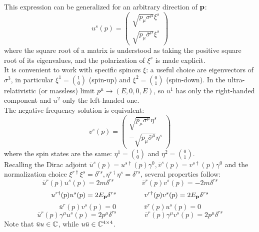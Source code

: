 This expression can be generalized for an arbitrary direction of $ \mathbf{p} $:
\begin{equation}
  u^s(p) =
  \begin{pmatrix}
    \sqrt{p_\mu \sigma^\mu} \xi^s \\
    \sqrt{p_\mu \bar{\sigma}^\mu} \xi^s
  \end{pmatrix}
  \label{eq:u-spinor-def}
\end{equation}
where the square root of a matrix is understood as taking the positive square root of its eigenvalues, and the polarization of $ \xi^s $ is made explicit.\\
It is convenient to work with specific spinors $ \xi $: a useful choice are eigenvectors of $ \sigma^3 $, in particular $ \xi^1 = \binom{1}{0} $ (spin-up) and $ \xi^2 = \binom{0}{1} $ (spin-down). In the ultra-relativistic (or massless) limit $ p^\mu \rightarrow (E, 0, 0, E) $, so $ u^1 $ has only the right-handed component and $ u^2 $ only the left-handed one.\\
The negative-frequency solution is equivalent:
\begin{equation}
  v^s(p) =
    \begin{pmatrix}
      \sqrt{p_\mu \sigma^\mu} \eta^s \\
      -\sqrt{p_\mu \bar{\sigma}^\mu} \eta^s
    \end{pmatrix}
  \label{eq:v-spinor-def}
\end{equation}
where the spin states are the same: $ \eta^1 = \binom{1}{0} $ and $ \eta^2 = \binom{0}{1} $.\\
Recalling the Dirac adjoint $ \bar{u}^s(p) = u^{s \dagger}(p) \gamma^0 , \bar{v}^s(p) = v^{s \dagger}(p) \gamma^0 $ and the normalization choice $ \xi^{r \dagger} \xi^s = \delta^{rs} , \eta^{r \dagger} \eta^s = \delta^{rs} $, several properties follow:
\begin{equation}
  \bar{u}^r(p) u^s(p) = 2m \delta^{rs}
  \qquad \qquad
  \bar{v}^r(p) v^s(p) = -2m \delta^{rs}
\end{equation}
\begin{equation}
  u^{r \dagger}(p) u^s(p) = 2E_{\mathbf{p}} \delta^{rs}
  \qquad \qquad
  v^{r \dagger}(p) v^s(p) = 2E_{\mathbf{p}} \delta^{rs}
  \label{eq:uv-spin-id}
\end{equation}
\begin{equation}
  \bar{u}^r(p) v^s(p) = 0
  \qquad \qquad
  \bar{v}^r(p) u^s(p) = 0
\end{equation}
\begin{equation}
  \bar{u}^r(p) \gamma^\mu u^s(p) = 2 p^\mu \delta^{rs}
  \qquad \qquad
  \bar{v}^r(p) \gamma^\mu v^s(p) = 2 p^\mu \delta^{rs}
\end{equation}
Note that $ \bar{u}u \in \mathbb{C} $, while $ u\bar{u} \in \mathbb{C}^{4 \times 4} $.

